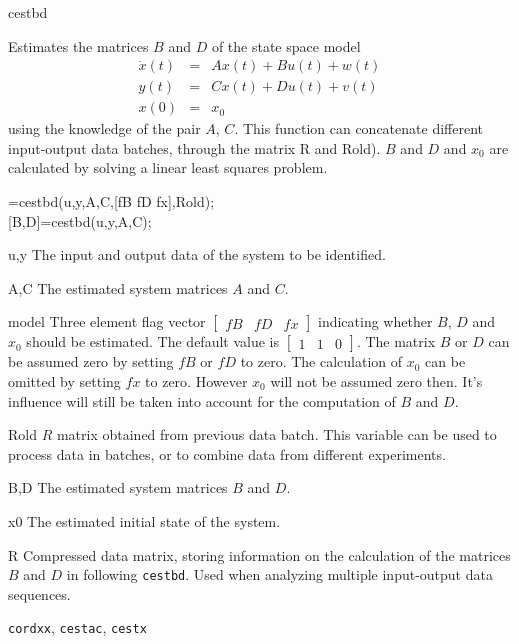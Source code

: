 \documentclass{book}
\newcommand{\mat}[2]{\left[\begin{array}{#1}#2\end{array}\right]}
\newcommand{\cordxx}{\texttt{cordxx}}
\newcommand{\cestac}{\texttt{cestac}}
\newcommand{\cestbd}{\texttt{cestbd}}
\newcommand{\cestx}{\texttt{cestx}}
\begin{document}
\begin{command}{cestbd}
   \begin{purpose}
    Estimates the matrices $B$ and $D$ of the state space model
    \begin{eqnarray*}
      \dot{x}(t) &=&  A x(t) + B u(t) +w(t)\\
      y(t) &=& C x(t) + D u(t) + v(t)\\
      x(0) &=& x_0
    \end{eqnarray*}
    using the knowledge of the pair $A$, $C$. This function can
    concatenate different input-output data batches, through the
    matrix R and Rold).  $B$ and $D$ and $x_0$ are calculated by
    solving a linear least squares problem.
  \end{purpose}
  \begin{syntax} 
    [B,D,x0,R]=cestbd(u,y,A,C,[fB fD fx],Rold);\\[0pt]
    [B,D]=cestbd(u,y,A,C);
  \end{syntax}
  \begin{inputs}
\item[u,y] The input and output data of the system to be identified.
\item[A,C] The estimated system matrices  $A$ and $C$.
\item[model] Three element flag vector $\mat{ccc}{fB& fD& fx}$ indicating whether 
  $B$, $D$ and $x_0$ should be estimated. The default value is $\mat{ccc}{1&1&0}$.
  The matrix $B$ or $D$  can be assumed zero by setting
  $fB$ or $fD$ to zero. The calculation of $x_0$ can be omitted by 
  setting $fx$ to zero. However $x_0$ will not be assumed zero then.
  It's influence will still be taken into account for the
  computation  of $B$ and $D$.
\item[Rold] $R$ matrix obtained from previous data batch. This variable
  can be used to process data in batches, or to combine data from
  different experiments.
  \end{inputs}
  \begin{outputs}
  \item[B,D]   The estimated system matrices $B$ and $D$.
  \item[x0]   The estimated initial state of the system.
  \item[R] Compressed data matrix,  storing information on the calculation of
    the  matrices $B$ and $D$ in following {\cestbd}. Used when analyzing
    multiple input-output data sequences.
  \end{outputs}
  \begin{seealso}
    {\cordxx}, {\cestac}, {\cestx}
  \end{seealso}
\end{command}%
\end{document}
